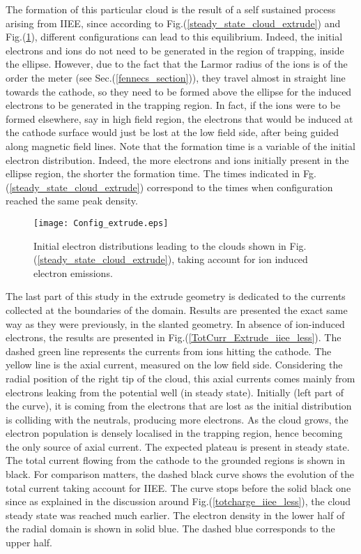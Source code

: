\break
The formation of this particular cloud is the result of a self sustained process arising from IIEE, since according to Fig.(\ref{steady_state_cloud_extrude}) and Fig.(\ref{Config_extrude}), different configurations can lead to this equilibrium. Indeed, the initial electrons and ions do not need to be generated in the region of trapping, inside the ellipse. However, due to the fact that the Larmor radius of the ions is of the order the meter (see Sec.(\ref{fennecs_section})), they travel almost in straight line towards the cathode, so they need to be formed above the ellipse for the induced electrons to be generated in the trapping region. In fact, if the ions were to be formed elsewhere, say in high field region, the electrons that would be induced at the cathode surface would just be lost at the low field side, after being guided along magnetic field lines. Note that the formation time is a variable of the initial electron distribution. Indeed, the more electrons and ions initially present in the ellipse region, the shorter the formation time. The times indicated in Fg.(\ref{steady_state_cloud_extrude}) correspond to the times when configuration reached the same peak density.\\


\begin{figure}[h!]
\centering
	\texttt{[image: Config\_extrude.eps]}
	\caption{\label{Config_extrude} Initial electron distributions leading to the clouds shown in Fig.(\ref{steady_state_cloud_extrude}), taking account for ion induced electron emissions.}
\end{figure}

The last part of this study in the extrude geometry is dedicated to the currents collected at the boundaries of the domain. Results are presented the exact same way as they were previously, in the slanted geometry. In absence of ion-induced electrons, the results are presented in Fig.(\ref{TotCurr_Extrude_iiee_less}). The dashed green line represents the currents from ions hitting the cathode. The yellow line is the axial current, measured on the low field side. Considering the radial position of the right tip of the cloud, this axial currents comes mainly from electrons leaking from the potential well (in steady state). Initially (left part of the curve), it is coming from the electrons that are lost as the initial distribution is colliding with the neutrals, producing more electrons. As the cloud grows, the electron population is densely localised in the trapping region, hence becoming the only source of axial current. The expected plateau is present in steady state. The total current flowing from the cathode to the grounded regions is shown in black. For comparison matters, the dashed black curve shows the evolution of the total current taking account for IIEE. The curve stops before the solid black one since as explained in the discussion around Fig.(\ref{totcharge_iiee_less}), the cloud steady state was reached much earlier. The electron density in the lower half of the radial domain is shown in solid blue. The dashed blue corresponds to the upper half.\\ 

